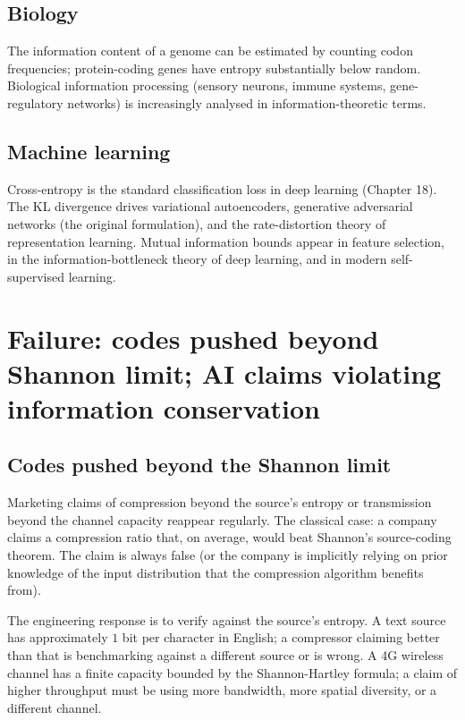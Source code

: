 \subsection{Biology}

The information content of a genome can be estimated by counting codon frequencies; protein-coding genes have entropy substantially below random. Biological information processing (sensory neurons, immune systems, gene-regulatory networks) is increasingly analysed in information-theoretic terms.

\subsection{Machine learning}

Cross-entropy is the standard classification loss in deep learning (Chapter 18). The KL divergence drives variational autoencoders, generative adversarial networks (the original formulation), and the rate-distortion theory of representation learning. Mutual information bounds appear in feature selection, in the information-bottleneck theory of deep learning, and in modern self-supervised learning.

\section{Failure: codes pushed beyond Shannon limit; AI claims violating information conservation}

\subsection{Codes pushed beyond the Shannon limit}

Marketing claims of compression beyond the source's entropy or transmission beyond the channel capacity reappear regularly. The classical case: a company claims a compression ratio that, on average, would beat Shannon's source-coding theorem. The claim is always false (or the company is implicitly relying on prior knowledge of the input distribution that the compression algorithm benefits from).

The engineering response is to verify against the source's entropy. A text source has approximately $1$ bit per character in English; a compressor claiming better than that is benchmarking against a different source or is wrong. A 4G wireless channel has a finite capacity bounded by the Shannon-Hartley formula; a claim of higher throughput must be using more bandwidth, more spatial diversity, or a different channel.

